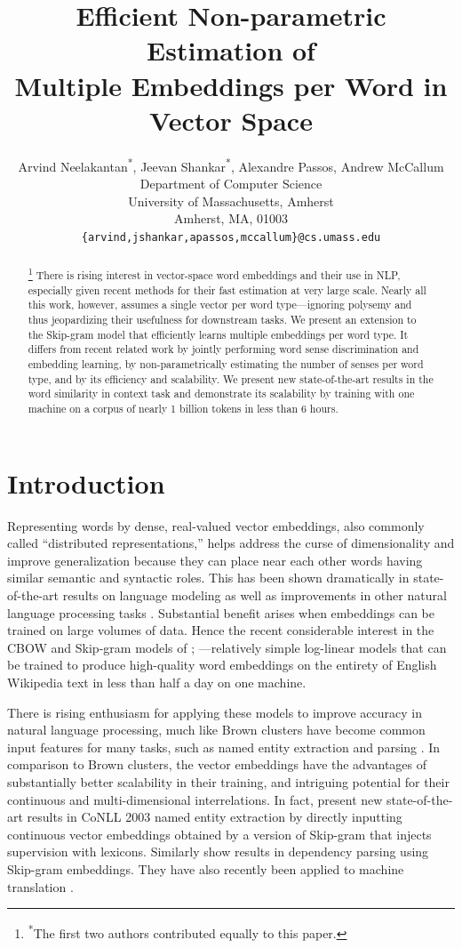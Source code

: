 \documentclass[11pt,a4paper]{article}
\title{Efficient  Non-parametric Estimation of \\ Multiple Embeddings per Word in Vector Space}
\author{Arvind Neelakantan\textsuperscript{*}, Jeevan Shankar\textsuperscript{*}, Alexandre Passos, Andrew McCallum  \\
  Department of Computer Science \\
University of Massachusetts, Amherst \\ Amherst, MA, 01003 \\
  {\tt \{arvind,jshankar,apassos,mccallum\}@cs.umass.edu} \\
 }
\date{}
\begin{document}
\maketitle
\begin{abstract}
\let\thefootnote\relax\footnote{\textsuperscript{*}The first two authors contributed equally to this paper.}
There is rising interest in vector-space word embeddings and their use
in NLP, especially given recent methods for their fast estimation at
very large scale.  Nearly all this work, however, assumes a single
vector per word type---ignoring polysemy and thus jeopardizing their
usefulness for downstream tasks.  We present an extension to the
Skip-gram model that efficiently learns multiple embeddings per word
type.  It differs from recent related work by jointly performing word
sense discrimination and embedding learning, by non-parametrically
estimating the number of senses per word type, and by its efficiency and
scalability.  We present new state-of-the-art results in the  word similarity in context task and
demonstrate its scalability by training with one machine on a corpus
of nearly 1 billion tokens in less than 6 hours.
\end{abstract}

\section{Introduction}

Representing words by dense, real-valued vector embeddings, also
commonly called ``distributed representations,'' helps address the
curse of dimensionality and improve generalization because they can
place near each other words having similar semantic and syntactic
roles.  This has been shown dramatically in state-of-the-art results
on language modeling \cite{bengio:2003,mnih:2007} as well as
improvements in other natural language processing tasks
\cite{collobert:2008,turian:2010}.  Substantial benefit arises when
embeddings can be trained on large volumes of data.  Hence the recent
considerable interest in the CBOW and Skip-gram models of
; ---relatively simple log-linear
models that can be trained to produce high-quality word embeddings on
the entirety of English Wikipedia text in less than half a day on one
machine.

There is rising enthusiasm for applying these models to improve
accuracy in natural language processing, much like Brown clusters
\cite{brown:1992} have become common input features for many tasks,
such as named entity extraction \cite{miller:2004,ratinov:2009} and
parsing \cite{koo:2008,tackstrom:2012}.  In comparison to Brown
clusters, the vector embeddings have the advantages of substantially
better scalability in their training, and intriguing potential for
their continuous and multi-dimensional interrelations.  In fact,
 present new state-of-the-art results in CoNLL
2003 named entity extraction by directly inputting continuous vector
embeddings obtained by a version of Skip-gram that injects supervision
with lexicons.  Similarly  show results in
dependency parsing using Skip-gram embeddings.  They have also
recently been applied to machine translation
\cite{zou:2013,mikolov:2013c}.
\end{document}
